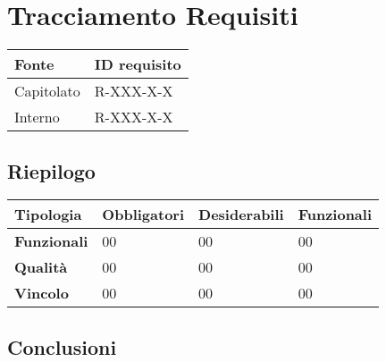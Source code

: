 \section{Tracciamento Requisiti}
\begin{table}[H]
\centering
    \begin{tabular}{|C{3.0cm}|C{3.0cm}|}
        \hline
         \textbf{Fonte} &
         \textbf{ID requisito}   
          \\
          \hline
          Capitolato & R-XXX-X-X \\
          \hline 
          Interno & R-XXX-X-X \\
          \hline
    \end{tabular}
\end{table}
\subsection{Riepilogo}
\begin{table}[H]
\centering
    \begin{tabular}{|C{3.0cm}|C{2.5cm}|C{2.5cm}|C{2.5cm}|}
        \hline
         \textbf{Tipologia} &
         \textbf{Obbligatori} & 
         \textbf{Desiderabili} &
         \textbf{Funzionali} 
          \\
          \hline
          \textbf{Funzionali} & 00 & 00 & 00 \\
          \hline 
          \textbf{Qualità} & 00 & 00 & 00\\
          \hline
          \textbf{Vincolo} & 00 & 00 & 00\\
          \hline
    \end{tabular}
\end{table}
\subsection{Conclusioni}